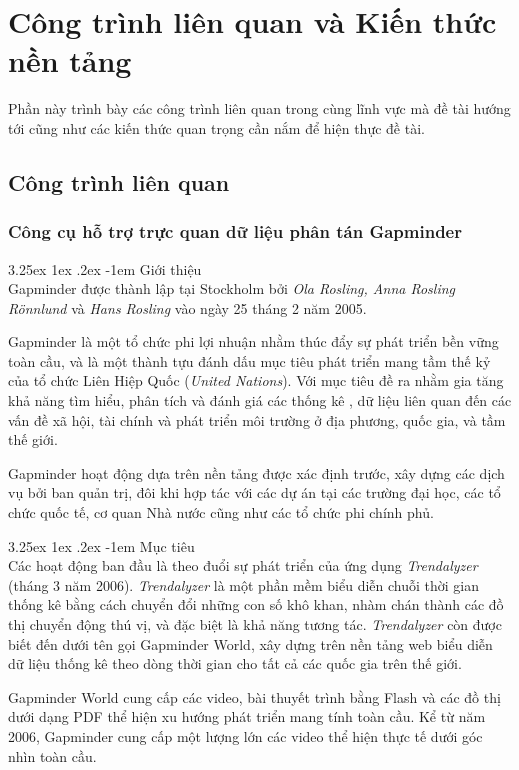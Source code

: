 \documentclass[12pt,a4paper,twoside]{article}
\makeatletter
\newcommand{\myparagraph}[1]{\paragraph{#1}\mbox{}\\} %
\renewcommand\paragraph{\@startsection{paragraph}{5}{\z@}%
  {3.25ex \@plus1ex \@minus.2ex}%
  {-1em}%
  {\normalfont\normalsize\bfseries}}
\makeatother
\begin{document}
\clearpage
\section{Công trình liên quan và Kiến thức nền tảng}
Phần này trình bày các công trình liên quan trong cùng lĩnh vực mà đề tài hướng tới cũng như các kiến thức quan trọng cần nắm để hiện thực đề tài.
\subsection{Công trình liên quan}\label{sec:related_work}
\subsubsection{Công cụ hỗ trợ trực quan dữ liệu phân tán Gapminder}
\myparagraph{Giới thiệu}
Gapminder\cite{gapminder} được thành lập tại Stockholm bởi \textit{Ola Rosling, Anna Rosling Rönnlund} và \textit{Hans Rosling} vào ngày 25 tháng 2 năm 2005. 

Gapminder là một tổ chức phi lợi nhuận nhằm thúc đẩy sự phát triển bền vững toàn cầu, và là một thành tựu đánh dấu mục tiêu phát triển mang tầm thế kỷ của tổ chức Liên Hiệp Quốc (\textit{United Nations}). Với mục tiêu đề ra nhằm gia tăng khả năng tìm hiểu, phân tích và đánh giá các thống kê , dữ liệu liên quan đến các vấn đề xã hội, tài chính và phát triển môi trường ở địa phương, quốc gia, và tầm thế giới.

Gapminder hoạt động dựa trên nền tảng được xác định trước, xây dựng các dịch vụ bởi ban quản trị, đôi khi hợp tác với các dự án  tại các trường đại học, các tổ chức quốc tế, cơ quan Nhà nước cũng như các tổ chức phi chính phủ.

\myparagraph{Mục tiêu}
Các hoạt động ban đầu là theo đuổi sự phát triển của ứng dụng \textit{Trendalyzer} (tháng 3 năm 2006). \textit{Trendalyzer} là một phần mềm biểu diễn chuỗi thời gian thống kê bằng cách chuyển đổi những con số khô khan, nhàm chán thành các đồ thị chuyển động thú vị, và đặc biệt là khả năng tương tác. \textit{Trendalyzer} còn được biết đến dưới tên gọi Gapminder World, xây dựng trên nền tảng web biểu diễn dữ liệu thống kê theo dòng thời gian cho tất cả các quốc gia trên thế giới.

Gapminder World\cite{gapminderworld} cung cấp các video, bài thuyết trình bằng Flash và các đồ thị dưới dạng PDF thể hiện xu hướng phát triển mang tính toàn cầu. Kể từ năm 2006, Gapminder cung cấp một lượng lớn các video thể hiện thực tế dưới góc nhìn toàn cầu. 
\end{document}

